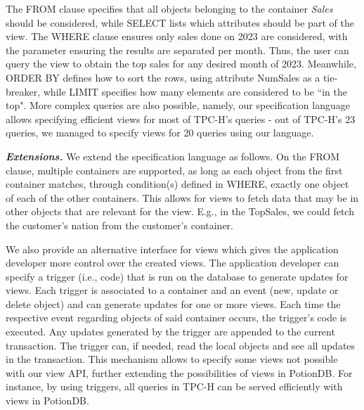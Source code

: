 \documentclass[sigconf, nonacm]{acmart}
\newcommand{\qcr}[1]{{\fontfamily{qcr}\selectfont #1}}
\begin{document}
The \qcr{FROM} clause specifies that all objects belonging to the container \emph{Sales} should be considered, while \qcr{SELECT} lists which attributes should be part of the view.
The \qcr{WHERE} clause ensures only sales done on 2023 are considered, with the parameter \qcr{[MONTH]} ensuring the results are separated per month.
Thus, the user can query the view to obtain the top sales for any desired month of 2023.
Meanwhile, \qcr{ORDER BY} defines how to sort the rows, using attribute \qcr{NumSales} as a tie-breaker, while \qcr{LIMIT} specifies how many elements are considered to be ``in the top".
More complex queries are also possible, namely, our specification language allows specifying efficient views for most of TPC-H's queries - out of TPC-H's 23 queries, we managed to specify views for 20 queries using our language.

\emph{\textbf{Extensions.}} We extend the specification language as follows.
On the \qcr{FROM} clause, multiple containers are supported, as long as each object from the first container matches, through condition(s) defined in \qcr{WHERE}, exactly one object of each of the other containers.
This allows for views to fetch data that may be in other objects that are relevant for the view.
E.g., in the TopSales, we could fetch the customer's nation from the customer's container.

We also provide an alternative interface for views which gives the application developer more control over the created views.
The application developer can specify a trigger (i.e., code) that is run on the database to generate updates for views.
Each trigger is associated to a container and an event (new, update or delete object) and can generate updates for one or more views.
Each time the respective event regarding objects of said container occurs, the trigger's code is executed.
Any updates generated by the trigger are appended to the current transaction.
The trigger can, if needed, read the local objects and see all updates in the transaction. %
This mechanism allows to specify some views not possible with our view API, further extending the possibilities of views in PotionDB.
For instance, by using triggers, all queries in TPC-H can be served efficiently with views in PotionDB.
\end{document}

